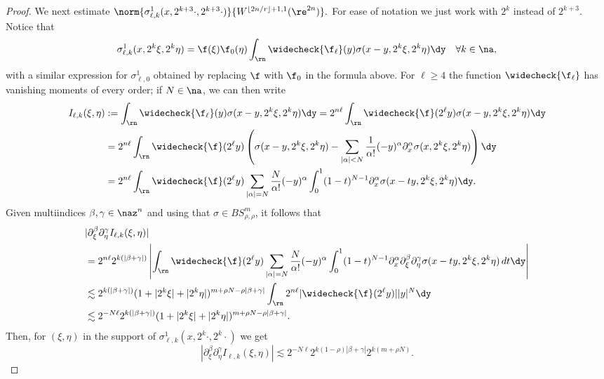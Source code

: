 \begin{proof}
We next estimate $\norm{\sigma^1_{\ell, k}(x, 2^{k+3} \cdot, 2^{k+3} \cdot)}{W^{\lfloor{2n/r}\rfloor + 1,1}(\re^{2n})}.$ For ease of notation we just work with $2^k$ instead of $2^{k+3}.$ Notice that 
\begin{equation*}
\sigma^1_{\ell, k}(x, 2^k \xi, 2^k \eta) = \f(\xi) \f_0(\eta) \int_{\rn} \widecheck{\f_\ell}(y) \sigma(x-y, 2^k \xi, 2^k \eta)\dy\quad \forall k\in\na,
\end{equation*}
with a similar expression for $\sigma^1_{\ell, 0}$ obtained by replacing $\f$ with $\f_0$ in the formula above. 
 For $\ell \geq 4$ the function $\widecheck{\f_\ell}$ has vanishing moments of every order; if $N \in \na$, we can then write
\begin{align*}
 I_{\ell, k}(\xi, \eta)&:= \int_{\rn} \widecheck{\f_\ell}(y) \sigma(x-y, 2^k \xi, 2^k \eta)\dy=2^{n \ell}\int_{\rn} \widecheck{\f}(2^{\ell}y) \sigma(x-y, 2^k \xi, 2^k \eta)\dy\\
& = 2^{n \ell} \int_{\rn} \widecheck{\f}(2^{\ell}y) \left( \sigma(x-y, 2^k \xi, 2^k \eta) - \sum\limits_{|\alpha| < N} \frac{1}{\alpha!} (-y)^\alpha \partial_x^\alpha \sigma(x, 2^k \xi, 2^k \eta) \right)\dy\\
& = 2^{n \ell} \int_{\rn} \widecheck{\f}(2^{\ell}y) \sum\limits_{|\alpha| = N} \frac{N}{\alpha!} (-y)^\alpha \int_0^1 (1-t)^{N-1} \partial_x^\alpha \sigma(x - t y, 2^k \xi, 2^k \eta) \dy.
\end{align*}
Given multiindices $\beta, \gamma \in \naz^n$ and using that $\sigma \in BS^m_{\rho, \rho}$, it follows that
\begin{align*}
& |\partial_\xi^{\beta} \partial_\eta^{\gamma}  I_{\ell, k}(\xi, \eta)|\\
& = 2^{n \ell} 2^{k (|\beta+ \gamma|)}  \left|  \int_{\rn} \widecheck{\f}(2^{\ell}y) \sum\limits_{|\alpha| = N} \frac{N}{\alpha!} (-y)^\alpha \int_0^1 (1-t)^{N-1} \partial_x^\alpha \partial_\xi^{\beta} \partial_\eta^{\gamma}\sigma(x - t y, 2^k \xi, 2^k \eta) \,dt\dy \right|\\
& \lesssim  2^{k (|\beta+ \gamma|)}  (1+ |2^k \xi| + |2^k \eta|)^{m + \rho N -  \rho|\beta+ \gamma|} \int_{\rn} 2^{n \ell} |\widecheck{\f}(2^{\ell}y)| |y|^N \dy \\
&\lesssim 2^{- N \ell} 2^{k (|\beta+ \gamma|)}  (1+ |2^k \xi| + |2^k \eta|)^{m + \rho N -  \rho |\beta+ \gamma|}.
\end{align*}
Then, for $(\xi,\eta)$ in the support of $\sigma^1_{\ell,k}(x, 2^k\cdot,2^k\cdot)$  we get
\begin{equation*}
 |\partial_\xi^{\beta} \partial_\eta^{\gamma}  I_{\ell, k}(\xi, \eta)| \lesssim 2^{- N \ell} 2^{k (1-\rho)|\beta+ \gamma|} 2^{k (m+\rho N)}.

\end{equation*}
\end{proof}
